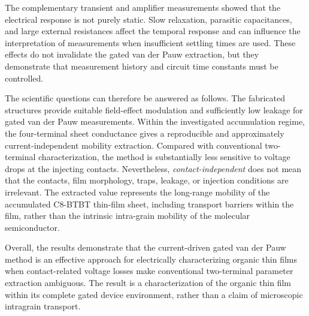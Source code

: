 The complementary transient and amplifier measurements showed that the
electrical response is not purely static. Slow relaxation, parasitic capacitances, and
large external resistances affect the temporal response and can influence the
interpretation of measurements when insufficient settling times are used.
These effects do not invalidate the gated van der Pauw extraction, but they
demonstrate that measurement history and circuit time constants must be
controlled.

The scientific questions can therefore be answered as follows. The fabricated
structures provide suitable field-effect modulation and sufficiently low
leakage for gated van der Pauw measurements. Within the investigated
accumulation regime, the four-terminal sheet conductance gives a reproducible
and approximately current-independent mobility extraction. Compared with
conventional two-terminal characterization, the method is substantially less
sensitive to voltage drops at the injecting contacts. Nevertheless,
\emph{contact-independent} does not mean that the contacts, film morphology,
traps, leakage, or injection conditions are irrelevant. The extracted value
represents the long-range mobility of the accumulated C8-BTBT thin-film sheet,
including transport barriers within the film, rather than the intrinsic
intra-grain mobility of the molecular semiconductor.

Overall, the results demonstrate that the current-driven gated van der Pauw
method is an effective approach for electrically characterizing organic thin
films when contact-related voltage losses make conventional two-terminal
parameter extraction ambiguous. The result is a characterization of the
organic thin film within its complete gated device environment, rather than a
claim of microscopic intragrain transport.